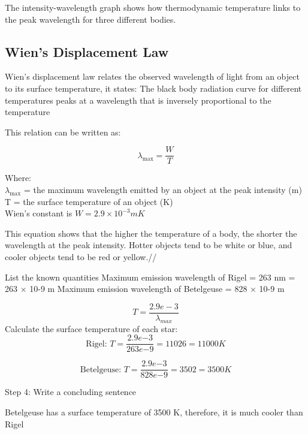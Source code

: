 The intensity-wavelength graph shows how thermodynamic temperature links to the peak wavelength for three different bodies.

\subsection {Wien's Displacement Law}
Wien’s displacement law relates the observed wavelength of light from an object to its surface temperature, it states:
The black body radiation curve for different temperatures peaks at a wavelength that is inversely proportional to the temperature

This relation can be written as:

\begin{equation*}
    \lambda_{\mathrm{max}}=\frac{W}{T}
\end{equation*}

Where:\\
$\lambda_{\mathrm{max}}$ = the maximum wavelength emitted by an object at the peak intensity (m) \\
T = the surface temperature of an object (K) \\
Wien's constant is $W=2.9\times 10^{-3} mK $

This equation shows that the higher the temperature of a body, the shorter the wavelength at the peak intensity. Hotter objects tend to be white or blue, and cooler objects tend to be red or yellow.//


\begin{soln}
List the known quantities
Maximum emission wavelength of Rigel = 263 nm = 263 × 10-9 m
Maximum emission wavelength of Betelgeuse = 828 × 10-9 m

$$T = \frac{2.9e-3}{\lambda_{max}}$$
Calculate the surface temperature of each star:
$$\text{Rigel: }T=\frac{2.9e{-3}}{263e{-9}}=11026 = 11 000K$$

$$\text{Betelgeuse: }T=\frac{2.9e{-3}}{828e{-9}}=3502 = 3500K$$

Step 4: Write a concluding sentence

Betelgeuse has a surface temperature of 3500 K, therefore, it is much cooler than Rigel
\end{soln}
